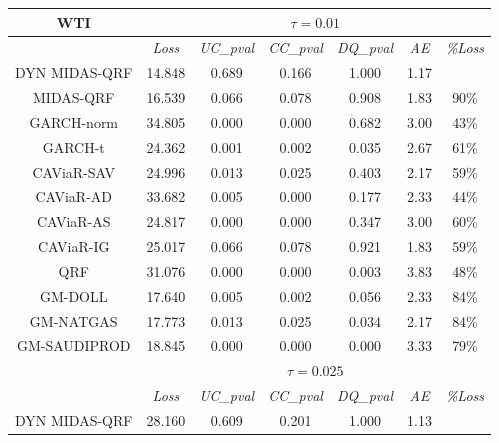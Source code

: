 \begin{table}[H]
\renewcommand{\arraystretch}{0.7}
\centering
\begin{tabular}{ccccccc}
\hline
\textbf{WTI} & \multicolumn{6}{c}{$\tau=0.01$}                         \\ \hline
                              & \textit{Loss}   & \textit{UC\_pval} & \textit{CC\_pval} & \textit{DQ\_pval }& \textit{AE }  & \textit{\%Loss}\\ \hline
\rowcolor[HTML]{D9D9D9} 
DYN MIDAS-QRF                       & 14.848 & 0.689    & 0.166    & 1.000    & 1.17 &        \\
\rowcolor[HTML]{D9D9D9} 
MIDAS-QRF                           & 16.539 & 0.066    & 0.078    & 0.908    & 1.83 & 90\%   \\
GARCH-norm                    & 34.805 & 0.000    & 0.000    & 0.682    & 3.00 & 43\%   \\
GARCH-t                       & 24.362 & 0.001    & 0.002    & 0.035    & 2.67 & 61\%   \\
\rowcolor[HTML]{D9D9D9} CAViaR-SAV                    & 24.996 & 0.013    & 0.025    & 0.403    & 2.17 & 59\%   \\
CAViaR-AD                     & 33.682 & 0.005    & 0.000    & 0.177    & 2.33 & 44\%   \\
CAViaR-AS                     & 24.817 & 0.000    & 0.000    & 0.347    & 3.00 & 60\%   \\
\rowcolor[HTML]{D9D9D9} 
CAViaR-IG                     & 25.017 & 0.066    & 0.078    & 0.921    & 1.83 & 59\%   \\
QRF                           & 31.076 & 0.000    & 0.000    & 0.003    & 3.83 & 48\%   \\
GM-DOLL                       & 17.640 & 0.005    & 0.002    & 0.056    & 2.33 & 84\%   \\
\rowcolor[HTML]{D9D9D9} GM-NATGAS                     & 17.773 & 0.013    & 0.025    & 0.034    & 2.17 & 84\%   \\
GM-SAUDIPROD                 & 18.845 & 0.000    & 0.000    & 0.000    & 3.33 & 79\%   \\ \hline
                              & \multicolumn{6}{c}{$\tau=0.025$}                        \\ \hline
                              & \textit{Loss}   & \textit{UC\_pval} & \textit{CC\_pval} & \textit{DQ\_pval }& \textit{AE }  & \textit{\%Loss}\\ \hline
\rowcolor[HTML]{D9D9D9} 
DYN MIDAS-QRF                       & 28.160 & 0.609    & 0.201    & 1.000    & 1.13 &        \\

\end{tabular}
\end{table}
